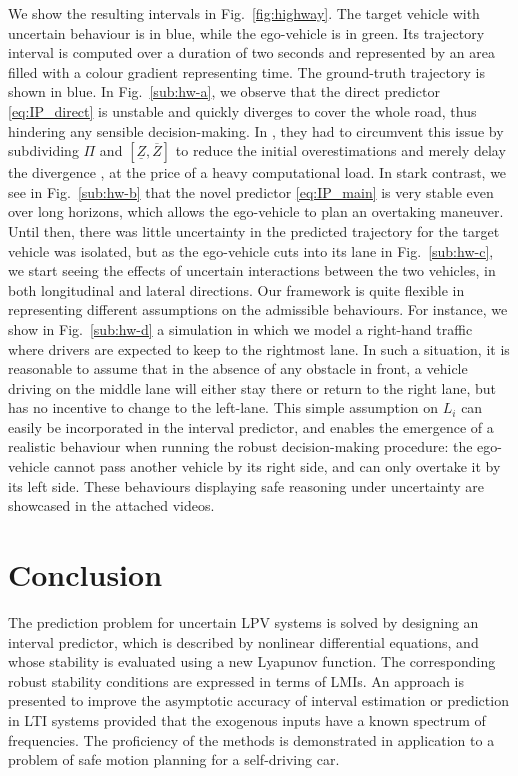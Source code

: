 \documentclass[letterpaper, 10 pt, conference]{ieeeconf}
\theoremstyle{plain}
\theoremstyle{definition}
\theoremstyle{plain}
\theoremstyle{plain}
\theoremstyle{remark}
\begin{document}
We show the resulting intervals in Fig.~\ref{fig:highway}. The target vehicle with uncertain behaviour is in blue, while the ego-vehicle is in green. Its trajectory interval is computed over a duration of two seconds and represented by an area filled with a colour gradient representing time. The ground-truth trajectory is shown in blue. In Fig.~\ref{sub:hw-a}, we observe that the direct predictor \eqref{eq:IP_direct} is unstable and quickly diverges to cover the whole road, thus hindering any sensible decision-making. In \cite{Leurent2018}, they had to circumvent this issue by subdividing $\Pi$ and $[\underline{Z}, \overline{Z}]$ to reduce the initial overestimations and merely delay the divergence \cite{Adrot2003}, at the price of a heavy computational load. In stark contrast, we see in Fig.~\ref{sub:hw-b} that the novel predictor \eqref{eq:IP_main} is very stable even over long horizons, which allows the ego-vehicle to plan an overtaking maneuver. Until then, there was little uncertainty in the predicted trajectory for the target vehicle was isolated, but as the ego-vehicle cuts into its lane in Fig.~\ref{sub:hw-c}, we start seeing the  effects of uncertain interactions between the two vehicles, in both longitudinal and lateral directions. Our framework is quite flexible in representing different assumptions on the admissible behaviours. For instance, we show in Fig.~\ref{sub:hw-d} a simulation in which we model a right-hand traffic where drivers are expected to keep to the rightmost lane. In such a situation, it is reasonable to assume that in the absence of any obstacle in front, a vehicle driving on the middle lane will either stay there or return to the right lane, but has no incentive to change to the left-lane. This simple assumption on $L_i$ can easily be incorporated in the interval predictor, and enables the emergence of a realistic behaviour when running the robust decision-making procedure: the ego-vehicle cannot pass another vehicle by its right side, and can only overtake it by its left side. These behaviours displaying safe reasoning under uncertainty are showcased in the attached videos.

\section{Conclusion}

The prediction problem for uncertain LPV systems is solved by designing an interval predictor, which is described by nonlinear differential equations, and whose stability is evaluated using a new Lyapunov function. The corresponding robust stability conditions are expressed in terms of LMIs. An approach is presented to improve the asymptotic accuracy of interval estimation or prediction in LTI systems provided that the exogenous inputs have a known spectrum of frequencies. The proficiency of the methods is demonstrated in application to a problem of safe motion planning for a self-driving car.



\end{document}
